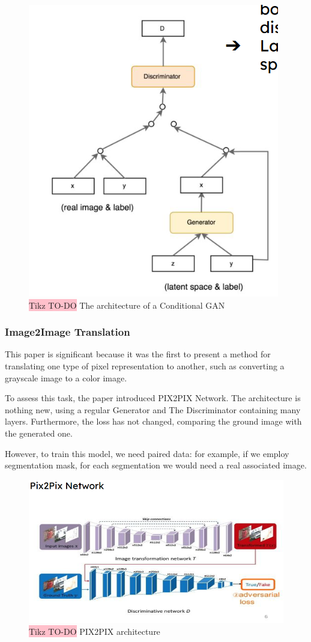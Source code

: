 \begin{figure}[!htbp]
    \centering
    \includegraphics[width=0.5\linewidth]{tikz/conditional gan.png}
    \caption{{\color{red}\colorbox{pink}{Tikz TO-DO}} The architecture of a Conditional GAN}
    \label{fig:conditional-GAN}
\end{figure}


\subsubsection{Image2Image Translation}

This paper is significant because it was the first to present a method for translating one type of pixel representation to another, such as converting a grayscale image to a color image.

To assess this task, the paper introduced PIX2PIX Network. The architecture is nothing new, using a regular Generator and The Discriminator containing many layers. Furthermore, the loss has not changed, comparing the ground image with the generated one.

However, to train this model, we need paired data: for example, if we employ segmentation mask, for each segmentation we would need a real associated image.
 

\begin{figure}[!htbp]
    \centering
    \includegraphics[width=\linewidth]{tikz/image2image.png}
    \caption{{\color{red}\colorbox{pink}{Tikz TO-DO}} PIX2PIX architecture}
    \label{fig:image-2-image}
\end{figure}


